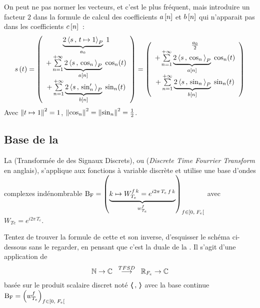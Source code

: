 \begin{exercice}
  On peut ne pas normer les vecteurs, et c'est le plus fréquent, mais
  introduire un facteur $2$ dans la formule de calcul des coefficients
  $a\left[n\right]$ et $b\left[n\right]$ qui n'apparait pas dans les coefficients
  $c\left[n\right]$~:
  \begin{equation}
    \label{eq:sdf_non_normee}
    s\left(t\right) = \left(
      \begin{array}{c}
        {\underbrace{2\,\langle s\,,\,t\mapsto 1{\rangle}_P}_{a_0}\;1} \\
        + \sum\limits_{n=1}^{+\infty}{\underbrace{2\,\langle s\,,\,\cos_n{\rangle}_P}_{a\left[n\right]}\;\cos_n(t)}  \\
        + \sum\limits_{n=1}^{+\infty}{\underbrace{2\,\langle s\,,\,\sin_n'{\rangle}_P}_{b\left[n\right]}\;\sin_n(t)}     
      \end{array}\right)
    = \left(
      \begin{array}{c}
        \frac{a_0}{2}  \\
        + \sum\limits_{n=1}^{+\infty}{\underbrace{2\,\langle s\,,\,\cos_n{\rangle}_P}_{a\left[n\right]}\;\cos_n(t)}  \\
        + \sum\limits_{n=1}^{+\infty}{\underbrace{2\,\langle s\,,\,\sin_n{\rangle}_P}_{b\left[n\right]}\;\sin_n(t)}
      \end{array}\right)
  \end{equation}
  Avec $\left\|t\mapsto 1\right\|^2=1$,
  $\left\|\cos_n\right\|^2=\left\|\sin_n\right\|^2= \frac{1}{2}$.

\end{exercice}


\subsection{Base de la \TFSD{}}

La \TFSD{} (Transformée de \Fourier{} des Signaux Discrets), ou
\DTFT{} (\emph{Discrete Time Fourrier Transform} en anglais),
s'applique aux fonctions à variable discrète et utilise une base
d'ondes complexes indénombrable
$\mathrm{B_F}=\left(\underbrace{k\mapsto W_{T_e}^{f\,k}=e^{i 2
      \pi\,T_e\,f\,k}}_{w_{T_e}^f}\right)_{f\in\left[0,\;F_e\right[{}}$ avec
$W_{Te}=e^{i 2 \pi\,T_e}$.

\begin{exercice}
  Tentez de trouver la formule de cette \TFSD{} et son inverse,
  d'esquisser le schéma ci-dessous sans le regarder, en pensant que
  c'est la \og{}duale\fg{} de la \sdf. Il s'agit d'une application
  de $$\mathbb{N}\rightarrow\mathbb{C}\;\;\overset{TFSD}{\longrightarrow}\;\;\mathbb{R}_{F_e}\rightarrow\mathbb{C}$$
  basée sur le produit scalaire discret noté $\langle\!\!\langle\,,\,\rangle\!\!\rangle$ avec la base
  continue $\mathrm{B_F}=\left(w_{T_e}^f\right)_{f\in\left[0,\;F_e\right[}$
\end{exercice}

